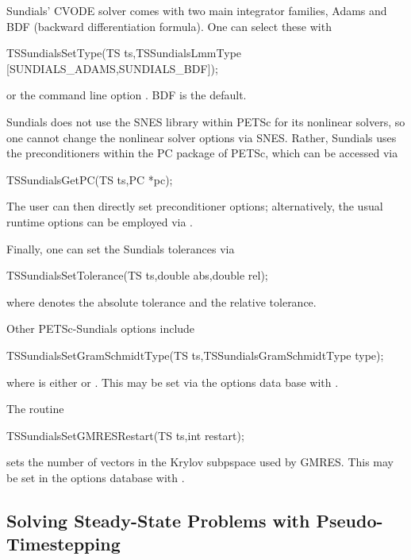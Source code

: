 Sundials' CVODE solver comes with two main integrator families, Adams
and BDF (backward differentiation formula). One can select these with
\begin{tabbing}
 TSSundialsSetType(TS ts,TSSundialsLmmType [SUNDIALS\_ADAMS,SUNDIALS\_BDF]);
\end{tabbing}
or the command line option . BDF is
the default. 
 

Sundials does not use the SNES library within PETSc for its nonlinear
solvers, so one cannot change the nonlinear solver options via
SNES. Rather, Sundials uses the preconditioners within the PC package
of PETSc, which can be accessed via
\begin{tabbing}
 TSSundialsGetPC(TS ts,PC *pc);
\end{tabbing}
The user can then directly set preconditioner options; 
alternatively, the usual runtime options can be employed
via . 

Finally, one can set the Sundials tolerances via
\begin{tabbing}
 TSSundialsSetTolerance(TS ts,double abs,double rel);
\end{tabbing}
where  denotes the absolute tolerance and 
the relative tolerance. 

Other PETSc-Sundials options include
\begin{tabbing}
  TSSundialsSetGramSchmidtType(TS ts,TSSundialsGramSchmidtType type);
\end{tabbing}
where  is either  or
. 
 This may be set via the options data base
with .

The routine 
\begin{tabbing}
  TSSundialsSetGMRESRestart(TS ts,int restart);
\end{tabbing}
sets the number of vectors in the Krylov subpspace used by GMRES.
This may be set in the options 
database with  . 


\subsection{Solving Steady-State Problems with Pseudo-Timestepping}

